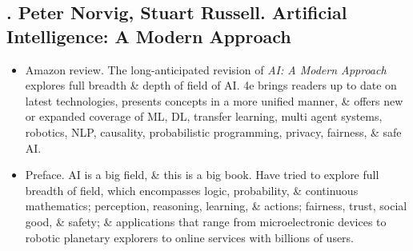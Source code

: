 \documentclass{article}
\begin{document}
\subsection{\cite{Norvig_Russel2021}. {\sc Peter Norvig, Stuart Russell}. Artificial Intelligence: A Modern Approach}
{}
\begin{itemize}
	\item {\sf Amazon review.} The long-anticipated revision of {\it AI: A Modern Approach} explores full breadth \& depth of field of AI. 4e brings readers up to date on latest technologies, presents concepts in a more unified manner, \& offers new or expanded coverage of ML, DL, transfer learning, multi agent systems, robotics, NLP, causality, probabilistic programming, privacy, fairness, \& safe AI.
	\item {\sf Preface.} AI is a big field, \& this is a big book. Have tried to explore full breadth of field, which encompasses logic, probability, \& continuous mathematics; perception, reasoning, learning, \& actions; fairness, trust, social good, \& safety; \& applications that range from microelectronic devices to robotic planetary explorers to online services with billions of users.
	

\end{itemize}
\end{document}
